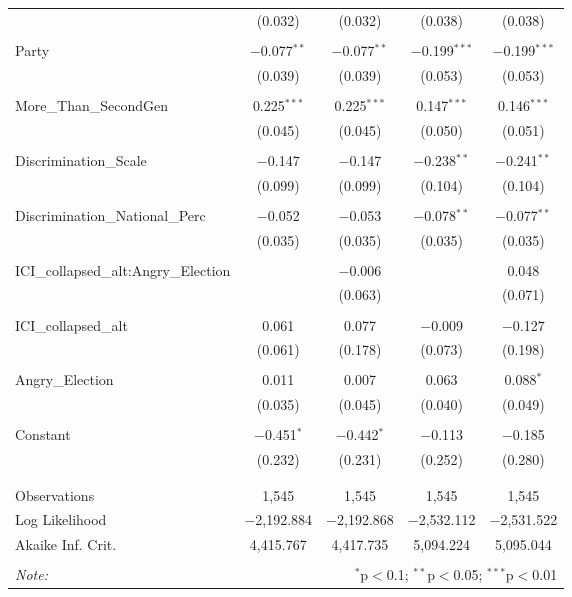 \begin{table}[!htbp]
\begin{tabular}{@{\extracolsep{5pt}}lcccc}
  & (0.032) & (0.032) & (0.038) & (0.038) \\ 
  & & & & \\ 
 Party & $-$0.077$^{**}$ & $-$0.077$^{**}$ & $-$0.199$^{***}$ & $-$0.199$^{***}$ \\ 
  & (0.039) & (0.039) & (0.053) & (0.053) \\ 
  & & & & \\ 
 More\_Than\_SecondGen & 0.225$^{***}$ & 0.225$^{***}$ & 0.147$^{***}$ & 0.146$^{***}$ \\ 
  & (0.045) & (0.045) & (0.050) & (0.051) \\ 
  & & & & \\ 
 Discrimination\_Scale & $-$0.147 & $-$0.147 & $-$0.238$^{**}$ & $-$0.241$^{**}$ \\ 
  & (0.099) & (0.099) & (0.104) & (0.104) \\ 
  & & & & \\ 
 Discrimination\_National\_Perc & $-$0.052 & $-$0.053 & $-$0.078$^{**}$ & $-$0.077$^{**}$ \\ 
  & (0.035) & (0.035) & (0.035) & (0.035) \\ 
  & & & & \\ 
 ICI\_collapsed\_alt:Angry\_Election &  & $-$0.006 &  & 0.048 \\ 
  &  & (0.063) &  & (0.071) \\ 
  & & & & \\ 
 ICI\_collapsed\_alt & 0.061 & 0.077 & $-$0.009 & $-$0.127 \\ 
  & (0.061) & (0.178) & (0.073) & (0.198) \\ 
  & & & & \\ 
 Angry\_Election & 0.011 & 0.007 & 0.063 & 0.088$^{*}$ \\ 
  & (0.035) & (0.045) & (0.040) & (0.049) \\ 
  & & & & \\ 
 Constant & $-$0.451$^{*}$ & $-$0.442$^{*}$ & $-$0.113 & $-$0.185 \\ 
  & (0.232) & (0.231) & (0.252) & (0.280) \\ 
  & & & & \\ 
\hline \\[-1.8ex] 
Observations & 1,545 & 1,545 & 1,545 & 1,545 \\ 
Log Likelihood & $-$2,192.884 & $-$2,192.868 & $-$2,532.112 & $-$2,531.522 \\ 
Akaike Inf. Crit. & 4,415.767 & 4,417.735 & 5,094.224 & 5,095.044 \\ 
\hline 
\hline \\[-1.8ex] 
\textit{Note:}  & \multicolumn{4}{r}{$^{*}$p$<$0.1; $^{**}$p$<$0.05; $^{***}$p$<$0.01} \\ 
\end{tabular} 
\end{table} 
